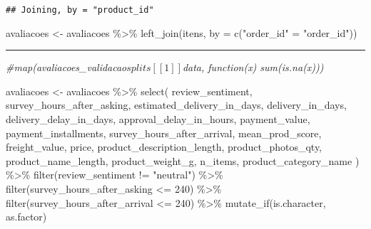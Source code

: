 \documentclass[
]{article}
\newenvironment{Shaded}{\begin{snugshade}}{\end{snugshade}}
\newcommand{\AttributeTok}[1]{\textcolor[rgb]{0.77,0.63,0.00}{#1}}
\newcommand{\CommentTok}[1]{\textcolor[rgb]{0.56,0.35,0.01}{\textit{#1}}}
\newcommand{\DecValTok}[1]{\textcolor[rgb]{0.00,0.00,0.81}{#1}}
\newcommand{\FunctionTok}[1]{\textcolor[rgb]{0.00,0.00,0.00}{#1}}
\newcommand{\NormalTok}[1]{#1}
\newcommand{\OtherTok}[1]{\textcolor[rgb]{0.56,0.35,0.01}{#1}}
\newcommand{\SpecialCharTok}[1]{\textcolor[rgb]{0.00,0.00,0.00}{#1}}
\newcommand{\StringTok}[1]{\textcolor[rgb]{0.31,0.60,0.02}{#1}}
\begin{document}
\begin{verbatim}
## Joining, by = "product_id"
\end{verbatim}

\begin{Shaded}
\begin{Highlighting}[]
\NormalTok{avaliacoes }\OtherTok{\textless{}{-}}\NormalTok{ avaliacoes }\SpecialCharTok{\%\textgreater{}\%}
  \FunctionTok{left\_join}\NormalTok{(itens, }\AttributeTok{by =} \FunctionTok{c}\NormalTok{(}\StringTok{"order\_id"} \OtherTok{=} \StringTok{"order\_id"}\NormalTok{))}
\end{Highlighting}
\end{Shaded}

\begin{center}\rule{0.5\linewidth}{0.5pt}\end{center}

\begin{Shaded}
\begin{Highlighting}[]
\CommentTok{\#map(avaliacoes\_validacao$splits[[1]]$data, function(x) sum(is.na(x)))}
\end{Highlighting}
\end{Shaded}

\begin{Shaded}
\begin{Highlighting}[]
\NormalTok{avaliacoes }\OtherTok{\textless{}{-}}\NormalTok{ avaliacoes }\SpecialCharTok{\%\textgreater{}\%}
  \FunctionTok{select}\NormalTok{(}
\NormalTok{    review\_sentiment,}
\NormalTok{    survey\_hours\_after\_asking,}
\NormalTok{    estimated\_delivery\_in\_days,}
\NormalTok{    delivery\_in\_days,}
\NormalTok{    delivery\_delay\_in\_days,}
\NormalTok{    approval\_delay\_in\_hours,}
\NormalTok{    payment\_value,}
\NormalTok{    payment\_installments,}
\NormalTok{    survey\_hours\_after\_arrival,}
\NormalTok{    mean\_prod\_score,}
\NormalTok{    freight\_value,}
\NormalTok{    price,}
\NormalTok{    product\_description\_length,}
\NormalTok{    product\_photos\_qty,}
\NormalTok{    product\_name\_length,}
\NormalTok{    product\_weight\_g,}
\NormalTok{    n\_items, }
\NormalTok{    product\_category\_name}
\NormalTok{  ) }\SpecialCharTok{\%\textgreater{}\%}
  \FunctionTok{filter}\NormalTok{(review\_sentiment }\SpecialCharTok{!=} \StringTok{"neutral"}\NormalTok{) }\SpecialCharTok{\%\textgreater{}\%}
  \FunctionTok{filter}\NormalTok{(survey\_hours\_after\_asking }\SpecialCharTok{\textless{}=} \DecValTok{240}\NormalTok{) }\SpecialCharTok{\%\textgreater{}\%}
  \FunctionTok{filter}\NormalTok{(survey\_hours\_after\_arrival }\SpecialCharTok{\textless{}=} \DecValTok{240}\NormalTok{) }\SpecialCharTok{\%\textgreater{}\%}
  \FunctionTok{mutate\_if}\NormalTok{(is.character, as.factor)}
\end{Highlighting}
\end{Shaded}
\end{document}
